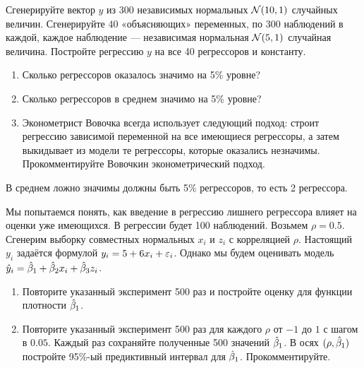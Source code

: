\begin{problem} %
Сгенерируйте вектор $y$ из 300 независимых нормальных $\mathcal{N}(10,1)$ случайных величин.
Сгенерируйте 40 «объясняющих» переменных, по 300 наблюдений в каждой, каждое наблюдение — независимая нормальная $\mathcal{N}(5,1)$ случайная величина. Постройте регрессию $y$ на все 40 регрессоров и константу.
\begin{enumerate}
\item Сколько регрессоров оказалось значимо на 5\% уровне?
\item Сколько регрессоров в среднем значимо на 5\% уровне?
\item Эконометрист Вовочка всегда использует следующий подход: строит регрессию зависимой переменной на все имеющиеся регрессоры, а затем выкидывает из модели те регрессоры, которые оказались незначимы. Прокомментируйте Вовочкин эконометрический подход.
\end{enumerate}


\begin{sol}
В среднем ложно значимы должны быть 5\% регрессоров, то есть 2 регрессора.
\end{sol}
\end{problem}



\begin{problem} %
Мы попытаемся понять, как введение в регрессию лишнего регрессора влияет на оценки уже имеющихся. В регрессии будет 100 наблюдений. Возьмем $\rho=0.5$. Сгенерим выборку совместных нормальных $x_i$ и $z_i$ с корреляцией $\rho$. Настоящий $y_i$ задаётся формулой $y_i=5+6x_i+\varepsilon_i$. Однако мы будем оценивать модель $\hat{y}_i=\hat{\beta}_1+\hat{\beta}_2 x_i+\hat{\beta}_3 z_i$.

\begin{enumerate}
\item Повторите указанный эксперимент 500 раз и постройте оценку для функции плотности $\hat{\beta}_1$.
\item Повторите указанный эксперимент 500 раз для каждого $\rho$ от $-1$ до $1$ с шагом в $0.05$. Каждый раз сохраняйте полученные 500 значений $\hat{\beta}_1$. В осях $(\rho,\hat{\beta}_1)$ постройте 95\%-ый предиктивный интервал для $\hat{\beta}_1$. Прокомментируйте.
\end{enumerate}


\begin{sol}
\end{sol}
\end{problem}


